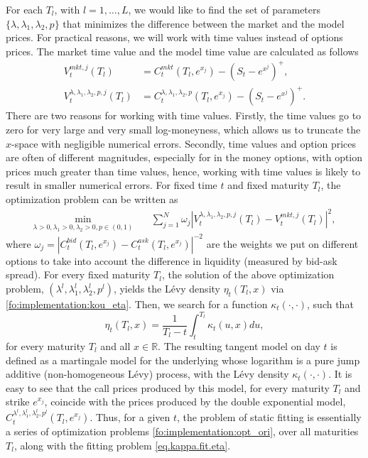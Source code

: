 \documentclass{article}
\numberwithin{equation}{section}
\newcommand\RR {\mathbb R}
\begin{document}
 
For each $T_l$, with $l=1,\ldots,L$, we would like to find the set of parameters $\{\lambda, \lambda_1, \lambda_2, p\}$ that minimizes the difference between the market and the model prices. 
For practical reasons, we will work with time values instead of options prices. The market time value and the model time value are calculated as follows
\begin{align*}
V_t^{mkt, j}(T_l) & = C_t^{mkt}(T_l,e^{x_j}) - (S_t - e^{x^j})^+,\\
V_t^{\lambda, \lambda_1, \lambda_2, p, j}(T_l) & = C_t^{\lambda, \lambda_1, \lambda_2, p}(T_l,e^{x_j}) - (S_t - e^{x^j})^+. 
\end{align*}
There are two reasons for working with time values. Firstly, the time values go to zero for very large and very small log-moneyness, which allows us to truncate the $x$-space with negligible numerical errors. Secondly, time values and option prices are often of different magnitudes, especially for in the money options, with option prices much greater than time values, hence, working with time values is likely to result in smaller numerical errors. 
For fixed time $t$ and fixed maturity $T_l$, the optimization problem can be written as
\begin{align}\label{fo:implementation:opt_ori}
\min_{\lambda > 0, \lambda_1>0, \lambda_2>0, p \in(0,1)} \quad & \sum_{j=1}^N \omega_j |V_t^{\lambda, \lambda_1, \lambda_2, p, j}(T_l) - V_t^{mkt,j}(T_l)|^2,
\end{align}
where $\omega_j = \left|C_t^{bid}(T_l,e^{x_j}) - C_t^{ask}(T_l,e^{x_j})\right|^{-2}$ are the weights we put on different options to take into account the difference in liquidity (measured by bid-ask spread).
For every fixed maturity $T_l$, the solution of the above optimization problem, $(\lambda^{l}, \lambda^{l}_1, \lambda^{l}_2, p^l)$, yields the L\'evy density $\eta_t(T_l,x)$ via \eqref{fo:implementation:kou_eta}.
Then, we search for a function $\kappa_t(\cdot,\cdot)$, such that
\begin{equation}\label{eq.kappa.fit.eta}
\eta_t(T_l,x) = \frac{1}{T_l-t}\int_t^{T_l}\kappa_t(u,x)du,
\end{equation}
for every maturity $T_l$ and all $x\in\RR$. The resulting tangent model on day $t$ is defined as a martingale model for the underlying whose logarithm is a pure jump additive (non-homogeneous L\'evy) process, with the L\'evy density $\kappa_t(\cdot,\cdot)$. It is easy to see that the call prices produced by this model, for every maturity $T_l$ and strike $e^{x_j}$, coincide with the prices produced by the double exponential model, $C_t^{\lambda^l, \lambda^l_1, \lambda^l_2, p^l}(T_l,e^{x_j})$.
Thus, for a given $t$, the problem of static fitting is essentially a series of optimization problems \eqref{fo:implementation:opt_ori}, over all maturities $T_l$, along with the fitting problem \eqref{eq.kappa.fit.eta}.
\end{document}
